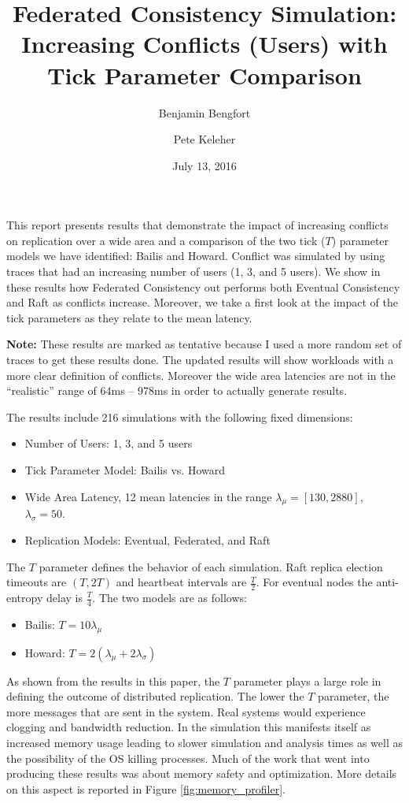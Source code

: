 \documentclass[10pt,letterpaper]{article}
\title{Federated Consistency Simulation: \\
 Increasing Conflicts (Users) with Tick Parameter Comparison}
\date{July 13, 2016}
\author[ ]{Benjamin Bengfort}
\author[ ]{Pete Keleher}
\affil[ ]{Department of Computer Science}
\affil[ ]{University of Maryland}
\affil[ ]{\textit{\{bengfort,keleher\}@cs.umd.edu}}
\begin{document}
\maketitle

This report presents results that demonstrate the impact of increasing conflicts on replication over a wide area and a comparison of the two tick ($T$) parameter models we have identified: Bailis and Howard. Conflict was simulated by using traces that had an increasing number of users (1, 3, and 5 users). We show in these results how Federated Consistency out performs both Eventual Consistency and Raft as conflicts increase. Moreover, we take a first look at the impact of the tick parameters as they relate to the mean latency.

\textbf{Note:} These results are marked as tentative because I used a more random set of traces to get these results done. The updated results will show workloads with a more clear definition of conflicts. Moreover the wide area latencies are not in the ``realistic'' range of 64ms -- 978ms in order to actually generate results.

The results include 216 simulations with the following fixed dimensions:

\begin{itemize}
    \item Number of Users: 1, 3, and 5 users
    \item Tick Parameter Model: Bailis vs. Howard
    \item Wide Area Latency, 12 mean latencies in the range $\lambda_{\mu} = [130, 2880]$,  $\lambda_{\sigma}=50$.
    \item Replication Models: Eventual, Federated, and Raft
\end{itemize}

The $T$ parameter defines the behavior of each simulation. Raft replica election timeouts are $(T, 2T)$ and heartbeat intervals are $\frac{T} {2}$. For eventual nodes the anti-entropy delay is $\frac {T} {4}$. The two models are as follows:

\begin{itemize}
    \item Bailis: $T=10\lambda_{\mu}$
    \item Howard: $T=2(\lambda_{\mu} + 2\lambda_{\sigma})$
\end{itemize}

As shown from the results in this paper, the $T$ parameter plays a large role in defining the outcome of distributed replication. The lower the $T$ parameter, the more messages that are sent in the system. Real systems would experience clogging and bandwidth reduction. In the simulation this manifests itself as increased memory usage leading to slower simulation and analysis times as well as the possibility of the OS killing processes. Much of the work that went into producing these results was about memory safety and optimization. More details on this aspect is reported in Figure \ref{fig:memory_profiler}.
\end{document}
